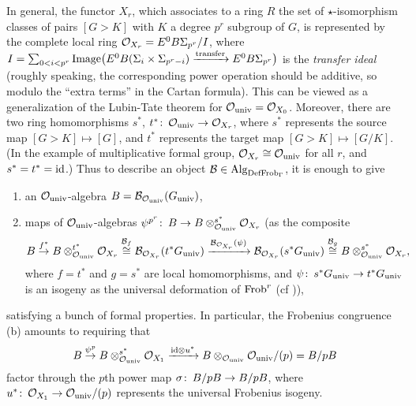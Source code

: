 \documentclass{gtpart}
\theoremstyle{definition}
\theoremstyle{remark}
\def\co{\colon\thinspace}
\newcommand{\Alg}{{\rm Alg}}
\newcommand{\Frob}{{\rm Frob}}
\newcommand{\CO}{{\cal O}}
\newcommand{\DF}{{{\rm DefFrob}_\Gamma}}
\begin{document}
In general, the functor $X_r$, which associates to a ring $R$ the 
set of $\star$-isomorphism classes of pairs $[G > K]$ with $K$ a 
degree $p^r$ subgroup of $G$, is represented by the complete 
local ring $\CO_{X_r} = E^0 B\Sigma_{p^r}/I$, where 
$I = \sum_{0<i<p^r} {\rm Image}\big(E^0 B(\Sigma_i\times\Sigma_{p^r-i}) 
\xrightarrow{\text{transfer}} E^0 B\Sigma_{p^r}\big)$ is 
the {\em transfer ideal} (roughly speaking, the corresponding 
power operation should be additive, so modulo the ``extra terms'' 
in the Cartan formula).  This can be viewed as a 
generalization of the Lubin-Tate theorem for $\CO_{\rm univ} = 
\CO_{X_0}$.  Moreover, there are two ring homomorphisms $s^*$, 
$t^*\co \CO_{\rm univ} \to \CO_{X_r}$, where $s^*$ represents the 
source map $[G > K] \mapsto [G]$, and $t^*$ represents the target 
map $[G > K] \mapsto [G/K]$.  (In the example of multiplicative 
formal group, $\CO_{X_r} \cong \CO_{\rm univ}$ for all $r$, and 
$s^* = t^* = {\rm id}$.)  Thus to describe an object 
${\cal B} \in \Alg_\DF$, it is enough to give 
\begin{enumerate}
\item an $\CO_{\rm univ}$-algebra 
$B = {\cal B}_{\CO_{\rm univ}}(G_{\rm univ})$, 
\item maps of $\CO_{\rm univ}$-algebras 
$\psi^{p^r}\co B \to B \otimes_{\CO_{\rm univ}}^{s^*} \CO_{X_r}$ 
(as the composite 
\[
 B \stackrel{f^*}{\to} B \otimes_{\CO_{\rm univ}}^{t^*} \CO_{X_r} 
\stackrel{{\cal B}_f}{\cong} {\cal B}_{\CO_{X_r}} (t^*G_{\rm univ}) 
\xrightarrow{{\cal B}_{\CO_{X_r}} (\psi)} {\cal B}_{\CO_{X_r}} (s^*G_{\rm univ}) 
\stackrel{{\cal B}_g}{\cong} B \otimes_{\CO_{\rm univ}}^{s^*} \CO_{X_r}, 
\]
where $f = t^*$ and $g = s^*$ are local homomorphisms, and 
$\psi\co s^*G_{\rm univ} \to t^*G_{\rm univ}$ is an isogeny as the 
universal deformation of $\Frob^r$ (cf \cite{strickland})),
\end{enumerate}
satisfying a bunch of formal properties.  In particular, the 
Frobenius congruence (b) amounts to requiring that 
\[
 B \stackrel{\psi^p}{\to} B \otimes_{\CO_{\rm univ}}^{s^*} \CO_{X_1} 
\xrightarrow{{\rm id} \otimes u^*} B \otimes_{\CO_{\rm univ}} \CO_{\rm univ}/(p) 
= B/pB
\]
factor through the $p$th power map $\sigma\co B/pB \to B/pB$, 
where $u^*\co \CO_{X_1} \to \CO_{\rm univ}/(p)$ represents the 
universal Frobenius isogeny.  
\end{document}
